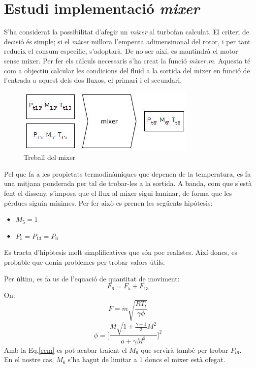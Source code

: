 \section{Estudi implementació \textit{mixer}}
S'ha considerat la possibilitat d'afegir un \textit{mixer} al turbofan calculat. El criteri de decisió és simple; si el \textit{mixer} millora l'empenta adimensinonal del rotor, i per tant redueix el consum específic, s'adoptarà. De no ser així, es mantindrà el motor sense mixer. Per fer els càlculs necessaris s'ha creat la funció \textit{mixer.m}. Aquesta té com a objectiu calcular les condicions del fluid a la sortida del mixer en funció de l'entrada a aquest dels dos fluxos, el primari i el secundari.
\begin{figure}[H]
	\centering
	\includegraphics[scale=0.6]{./pics/mixer}
	\caption{Treball del mixer}
\end{figure}
Pel que fa a les propietats termodinàmiques que depenen de la temperatura, es fa una mitjana ponderada per tal de trobar-les a la sortida. A banda, com que s'està fent el disseny, s'imposa que el flux al mixer sigui laminar, de forma que les pèrdues siguin mínimes. Per fer això es prenen les següents hipòtesis:
\begin{itemize}
\item $M_5 = 1$
\item $P_5 = P_{13} = P_6$
\end{itemize}
Es tracta d'hipòtesis molt simplificatives que són poc realistes. Així doncs, es probable que donin problemes per trobar valors útils.

Per últim, es fa us de l'equació de quantitat de moviment:
\begin{equation}
\label{ccm}
F_6 = F_5 + F_{13}
\end{equation}
On:
\begin{equation}
F = \dot{m}\sqrt{\frac{RT_t}{\gamma\phi}}
\end{equation}
\begin{equation}
\label{phi}
\phi = \Bigg[ \frac{M\sqrt{1+\frac{\gamma-1}{2}M^2}}{a+\gamma M^2}\Bigg]^2
\end{equation}
Amb la Eq.\ref{ccm} es pot acabar traient el $M_6$ que servirà també per trobar $P_{t6}$. En el nostre cas, $M_6$ s'ha hagut de limitar a 1 doncs el mixer està ofegat.

